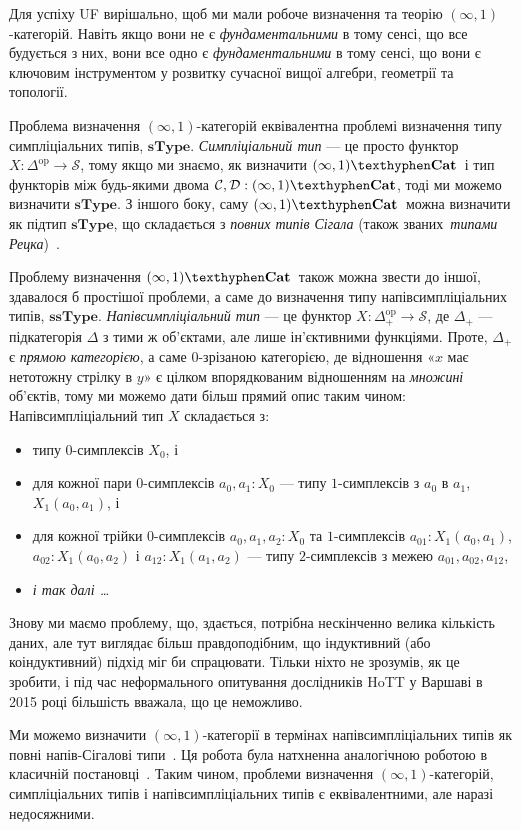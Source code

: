 \documentclass[12pt]{article}
\newcommand*{\calC}{\mathcal{C}}
\newcommand*{\calD}{\mathcal{D}}
\newcommand*{\calS}{\mathcal{S}}
\newcommand*{\inftyone}{\ensuremath{(\infty,1)}}
\newcommand*{\sType}{\ensuremath{\mathbf{sType}}}
\newcommand*{\ssType}{\ensuremath{\mathbf{ssType}}}
\newcommand*{\inftyoneCat}{\ensuremath{(\infty,1)\mathbf{\texthyphen Cat}}}
\newcommand*{\op}{^{\mathrm{op}}}
\begin{document}
Для успіху UF вирішально, щоб ми мали робоче визначення та теорію \inftyone-категорій. Навіть якщо вони не є \emph{фундаментальними} в тому сенсі, що все будується з них, вони все одно є \emph{фундаментальними} в тому сенсі, що вони є ключовим інструментом у розвитку сучасної вищої алгебри, геометрії та топології.

Проблема визначення \inftyone-категорій еквівалентна проблемі визначення типу симпліціальних типів, \sType. \emph{Симпліціальний тип} — це просто функтор $X : \Delta\op\to\calS$, тому якщо ми знаємо, як визначити \inftyoneCat\ і тип функторів між будь-якими двома $\calC,\calD:\inftyoneCat$, тоді ми можемо визначити \sType. З іншого боку, саму \inftyoneCat\ можна визначити як підтип \sType, що складається з \emph{повних типів Сігала} (також званих~\emph{типами Рецка})~\cite{RiehlShulman2017}.

Проблему визначення \inftyoneCat~також можна звести до іншої, здавалося б простішої проблеми, а саме до визначення типу напівсимпліціальних типів, \ssType. \emph{Напівсимпліціальний тип} — це функтор $X:\Delta_+\op\to\calS$, де $\Delta_+$ — підкатегорія $\Delta$ з тими ж об'єктами, але лише ін'єктивними функціями. Проте, $\Delta_+$ є \emph{прямою категорією}, а саме $0$-зрізаною категорією, де відношення «$x$ має нетотожну стрілку в $y$» є цілком впорядкованим відношенням на \emph{множині} об'єктів, тому ми можемо дати більш прямий опис таким чином: Напівсимпліціальний тип $X$ складається з:
\begin{itemize}
\item типу $0$-симплексів $X_0$, і
\item для кожної пари $0$-симплексів $a_0,a_1:X_0$ — типу $1$-симплексів з $a_0$ в $a_1$, $X_1(a_0,a_1)$, і
\item для кожної трійки $0$-симплексів $a_0,a_1,a_2:X_0$ та $1$-симплексів $a_{01}:X_1(a_0,a_1)$, $a_{02}:X_1(a_0,a_2)$ і $a_{12}:X_1(a_1,a_2)$ — типу $2$-симплексів з межею $a_{01},a_{02},a_{12}$,
\item \emph{і так далі \ldots}
\end{itemize}
Знову ми маємо проблему, що, здається, потрібна нескінченно велика кількість даних, але тут виглядає більш правдоподібним, що індуктивний (або коіндуктивний) підхід міг би спрацювати. Тільки ніхто не зрозумів, як це зробити, і під час неформального опитування дослідників HoTT у Варшаві в 2015 році більшість вважала, що це неможливо.

Ми можемо визначити \inftyone-категорії в термінах напівсимпліціальних типів як повні напів-Сігалові типи~\cite{CapriottiKraus2017}. Ця робота була натхненна аналогічною роботою в класичній постановці~\cite{Harpaz2015}. Таким чином, проблеми визначення \inftyone-категорій, симпліціальних типів і напівсимпліціальних типів є еквівалентними, але наразі недосяжними.
\end{document}
